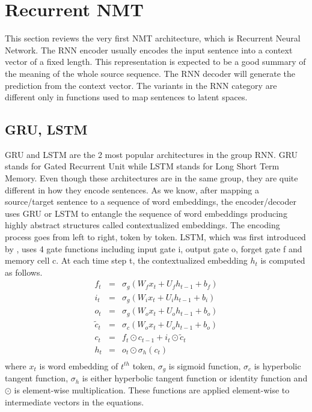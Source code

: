 \section{Recurrent NMT} \label{sec:rrn}
This section reviews the very first NMT architecture, which is Recurrent Neural Network. The RNN encoder usually encodes the input sentence into a context vector of a fixed length. This representation is expected to be a good summary of the meaning of the whole source sequence. The RNN decoder will generate the prediction from the context vector. The variants in the RNN category are different only in functions used to map sentences to latent spaces.
\subsection{GRU, LSTM}
GRU and LSTM are the 2 most popular architectures in the group RNN. GRU stands for Gated Recurrent Unit while LSTM stands for Long Short Term Memory. Even though these architectures are in the same group, they are quite different in how they encode sentences. As we know, after mapping a source/target sentence to a sequence of word embeddings, the encoder/decoder uses GRU or LSTM to entangle the sequence of word embeddings producing highly abstract structures called contextualized embeddings. The encoding process goes from left to right, token by token. LSTM, which was first introduced by \cite{Hochreiter97long}, uses 4 gate
functions including input gate i, output gate o, forget gate f and memory cell c. At each time step t, the contextualized embedding $h_t$ is computed as follows.
\begin{equation}
\label{eq:lstm}
\begin{array}{rcl}
f_t &=& \sigma_g (W_f x_t + U_f h_{t-1} + b_f)\\
i_t &=& \sigma_g (W_i x_t + U_i h_{t-1} + b_i)\\
o_t &=& \sigma_g (W_o x_t + U_o h_{t-1} + b_o)\\
\tilde{c}_t &=& \sigma_c (W_o x_t + U_o h_{t-1} + b_o)\\
c_t &=& f_t \odot c_{t-1} + i_t \odot \tilde{c}_t\\
h_t &=& o_t \odot \sigma_h(c_t)\\
\end{array}
\end{equation}
where $x_t$ is word embedding of $t^{th}$ token, $\sigma_g$ is sigmoid function, $\sigma_c$ is hyperbolic tangent function, $\sigma_h$ is either hyperbolic tangent function or identity function and $\odot$ is element-wise multiplication. These functions are applied element-wise to intermediate vectors in the equations.

